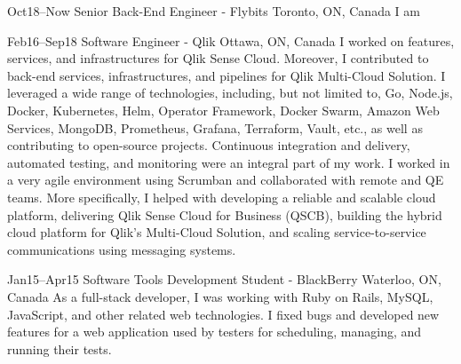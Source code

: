 \documentclass[]{cv-style}                     %
\begin{document}
\begin{entrylist}

  \entry
  {Oct18--Now}
  {Senior Back-End Engineer - Flybits}
  {Toronto, ON, Canada}
  {I am}

  \entry
  {Feb16--Sep18}
  {Software Engineer - Qlik}
  {Ottawa, ON, Canada}
  {I worked on features, services, and infrastructures for Qlik Sense Cloud.
   Moreover, I contributed to back-end services, infrastructures, and pipelines for Qlik Multi-Cloud Solution.
   I leveraged a wide range of technologies, including, but not limited to,
   Go, Node.js, Docker, Kubernetes, Helm, Operator Framework, Docker Swarm, Amazon Web Services,
   MongoDB, Prometheus, Grafana, Terraform, Vault, etc., as well as contributing to open-source projects.
   Continuous integration and delivery, automated testing, and monitoring were an integral part of my work.
   I worked in a very agile environment using Scrumban and collaborated with remote and QE teams.
   More specifically, I helped with developing a reliable and scalable cloud platform, delivering Qlik Sense Cloud for Business (QSCB), building the hybrid cloud platform for Qlik's Multi-Cloud Solution, and scaling service-to-service communications using messaging systems.}

  \entry
  {Jan15--Apr15}
  {Software Tools Development Student - BlackBerry}
  {Waterloo, ON, Canada}
  {As a full-stack developer, I was working with Ruby on Rails, MySQL, JavaScript, and other related web technologies.
  I fixed bugs and developed new features for a web application used by testers for scheduling, managing, and running their tests.}



\end{entrylist}


\end{document}
